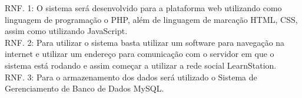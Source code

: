 \documentclass[12pt,a4paper,onecolumn,titlepage]{article}
\begin{document}
\qquad RNF. 1: O sistema será desenvolvido para a plataforma web utilizando como linguagem de programação o PHP, além de linguagem de marcação HTML, CSS, assim como utilizando JavaScript.\\

RNF. 2: Para utilizar o sistema basta utilizar um software para navegação na internet e utilizar um endereço para comunicação com o servidor em que o sistema está rodando e assim começar a utilizar a rede social LearnStation.\\

RNF. 3: Para o armazenamento dos dados será utilizado o Sistema de Gerenciamento de Banco de Dados MySQL.\\





  
  

\renewcommand{\contentsname}{Índice}
\tableofcontents


%
%
\end{document}
